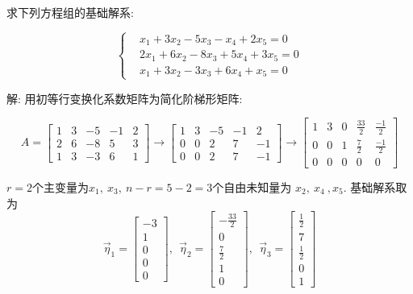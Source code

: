 \begin{eg}
求下列方程组的基础解系:

\begin{displaymath}\left\{\begin{aligned}
&x_1+3x_2-5x_3-x_4+2x_5=0\\
&2x_1+6x_2-8x_3+5x_4+3x_5=0\\
&x_1+3x_2-3x_3+6x_4+x_5=0
\end{aligned}\right.\end{displaymath}

解: 用初等行变换化系数矩阵为简化阶梯形矩阵:

\begin{displaymath}
A=\begin{bmatrix}1&3&-5&-1&2\\2&6&-8&5&3\\1&3&-3&6&1\end{bmatrix}\rightarrow
\begin{bmatrix}1&3&-5&-1&2\\0&0&2&7&-1\\0&0&2&7&-1\end{bmatrix}\rightarrow
\begin{bmatrix}1&3&0&\frac{33}{2}&\frac{-1}{2}\\0&0&1&\frac{7}{2}&\frac{-1}{2}\\
0&0&0&0&0\end{bmatrix}\end{displaymath}

$r=2$个主变量为$x_1,\ x_3,\ n-r = 5-2 = 3$个自由未知量为 $x_2,\ x_4\ , x_5$. 基础解系取为
\begin{displaymath}\vec{\eta}_1=\begin{bmatrix}-3\\1\\0\\0\\0\end{bmatrix},\ \ \vec{\eta}_2=\begin{bmatrix}-\frac{33}{2}\\0\\ \frac{7}{2}\\1\\0\end{bmatrix},\ \ \vec{\eta}_3=\begin{bmatrix}\frac{1}{2}\\7\\ \frac{1}{2}\\0\\1\end{bmatrix}\end{displaymath}


\end{eg}
